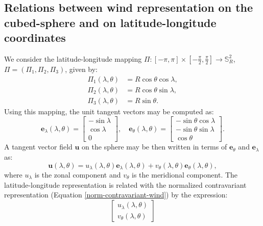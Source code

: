 \documentclass[preprint,12pt]{elsarticle}
\begin{document}
\begin{linenumbers}
\section{Relations between wind representation on the cubed-sphere and on latitude-longitude coordinates}
\label{ap-wind}
We consider the latitude-longitude mapping 
${\Pi}: [-\pi,\pi] \times [-\frac{\pi}{2},\frac{\pi}{2}] \to \mathbb{S}^2_R$, 
${\Pi} = ({\Pi}_1,{\Pi}_2,{\Pi}_3)$, given by:
\begin{align}
	\label{ll2sph}
	{\Pi}_1(\lambda,\theta) &= R\cos \theta \cos \lambda,\\
	{\Pi}_2(\lambda,\theta) &= R\cos \theta \sin \lambda,\\
	{\Pi}_3(\lambda,\theta) &= R\sin \theta.
\end{align}
Using this mapping,  the unit tangent vectors may be computed as:
\begin{equation}
	\label{latlon_tg_vectors}
	\boldsymbol{e}_{\lambda}(\lambda,\theta) = 
	\begin{bmatrix}
		-\sin \lambda \\
		\cos \lambda \\
		0
	\end{bmatrix}, \quad
	\boldsymbol{e}_{\theta}(\lambda,\theta) =
	\begin{bmatrix}
		-\sin \theta \cos \lambda \\
		-\sin \theta \sin \lambda \\
		\cos \theta
	\end{bmatrix}.
\end{equation}
A tangent vector field $\boldsymbol{u}$ on the sphere may be then written in terms of $\boldsymbol{e}_{\theta}$ and $\boldsymbol{e}_{\lambda}$ as:
\begin{equation}
	\label{latlon-wind}
	\boldsymbol{u}(\lambda, \theta) = 
	u_{\lambda} (\lambda, \theta) \boldsymbol{e}_{\lambda} (\lambda, \theta) + 
	v_{\theta} (\lambda, \theta) \boldsymbol{e}_{\theta} (\lambda, \theta), 
\end{equation}
where $u_{\lambda}$ is the zonal component and $v_{\theta}$ is the meridional component.
The latitude-longitude representation is related with the normalized contravariant representation (Equation \eqref{norm-contravariant-wind})  by the expression:
\begin{equation}
	\label{ll-to-normcontravariant}
	\begin{bmatrix}
		u_\lambda (\lambda, \theta) \\
		v_\theta (\lambda, \theta) 
	\end{bmatrix}

\end{equation}
\end{linenumbers}
\end{document}
